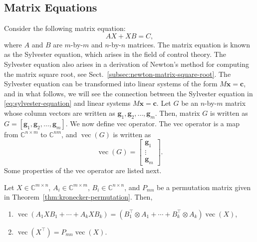 \subsection{{Matrix Equations}}\label{sec:matrix-equations}
{Consider the following matrix equation:}
\begin{equation}\label{eq:sylvester-equation}
AX+XB=C,
\end{equation}
{where $A$ and $B$ are $m$-by-$m$ and $n$-by-$n$ matrices. The matrix equation is known as the Sylvester equation, which arises in the field of control theory. The Sylvester equation also arises in a derivation of Newton's method for computing the matrix square root, see Sect.\ \ref{subsec:newton-matrix-square-root}.}
{The Sylvester equation can be transformed into linear systems of the form $M\boldsymbol{x}=\boldsymbol{c}$, and in what follows, we will see the connection between the Sylvester equation in \eqref{eq:sylvester-equation} and linear systems $M\boldsymbol{x}=\boldsymbol{c}$.}
{Let $G$ be an $n$-by-$m$ matrix whose column vectors are written as $\boldsymbol{g}_1,\boldsymbol{g}_2,\ldots,\boldsymbol{g}_m$. Then, matrix $G$ is written as $G=[\boldsymbol{g}_1,\boldsymbol{g}_2,\ldots,\boldsymbol{g}_m]$. We now define vec operator. The vec operator is a map from $\mathbb{C}^{n\times m}$ to $\mathbb{C}^{nm}$, and $\operatorname{vec}(G)$ is written as}
\begin{equation}\label{eq:vectorization-definition}
\operatorname{vec}(G)=\begin{bmatrix}\boldsymbol{g}_1\\\vdots\\\boldsymbol{g}_m\end{bmatrix}.
\end{equation}
{Some properties of the vec operator are listed next.}
\begin{Theorem}\label{thm:vectorization-properties}
{Let $X\in\mathbb{C}^{m\times n}$, $A_i\in\mathbb{C}^{m\times m}$, $B_i\in\mathbb{C}^{n\times n}$, and $P_{mn}$ be a permutation matrix given in Theorem\ \ref{thm:kronecker-permutation}. Then,}
\begin{enumerate}
\item $\operatorname{vec}(A_1XB_1+\cdots+A_kXB_k)=(B_1^{\top}\otimes A_1+\cdots+B_k^{\top}\otimes A_k)\operatorname{vec}(X)$,
\item $\operatorname{vec}(X^{\top})=P_{mn}\operatorname{vec}(X)$.
\end{enumerate}
\end{Theorem}

